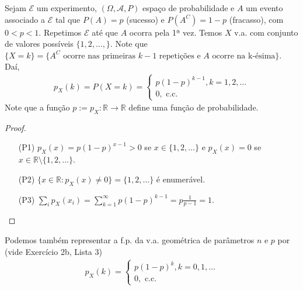 \documentclass[../Notas.tex]{subfiles}
\begin{document}
\begin{example}
Sejam $\mathcal{E}$ um experimento, $(\Omega, \mathcal{A}, P)$ espaço de probabilidade e $A$ um evento associado a $\mathcal{E}$ tal que $P(A) = p$ (sucesso) e $P(A^C) = 1 - p$ (fracasso), com $ 0 < p < 1$. Repetimos $\mathcal{E}$ até que $A$ ocorra pela 1ª vez. Temos $X$ v.a. com conjunto de valores possíveis $\{ 1, 2, \dots,  \}$. Note que $\{ X = k \} = \{ A^C\text{ ocorre nas primeiras } k-1 \text{ repetições e } A \text{ ocorre na k-ésima} \}$. Daí,
\begin{align*}
    p_X(k) = P(X=k) = \begin{cases}
    p(1-p)^{k-1}, k = 1, 2, \dots \\
    0, \text{ c.c.}
    \end{cases}
\end{align*}
Note que a função $p:= p_X:\mathbb{R}\to\mathbb{R}$ define uma função de probabilidade.
\begin{proof}
\begin{itemize}
    \item[(P1)] $p_X(x) = p(1-p)^{x-1} > 0$ se $x\in\{1, 2, \dots\}$ e $p_X(x) = 0$ se $x\in\mathbb{R}\setminus\{1, 2, \dots\}$.
    \item[(P2)] $\{ x\in\mathbb{R} : p_X(x)\neq 0 \} = \{ 1, 2, \dots \}$ é enumerável.
    \item[(P3)] $\displaystyle{ \sum_i p_X(x_i) = \sum_{k=1}^{\infty}p(1-p)^{k-1} = p\frac{1}{p-1} = 1.}$
\end{itemize}
\end{proof}
Podemos também representar a f.p. da v.a. geométrica de parâmetros $n$ e $p$ por (vide Exercício 2b, Lista 3)
\begin{align*}
    p_X(k) = \begin{cases}
    p(1-p)^k, k = 0, 1, \dots \\
    0, \text{ c.c.}
    \end{cases}
\end{align*}
\end{example}
\end{document}
